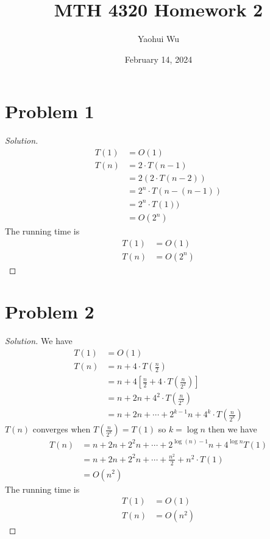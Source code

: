 \documentclass[12pt, letterpaper]{article}
\title{MTH 4320 Homework 2}
\author{Yaohui Wu}
\date{February 14, 2024}
\newenvironment{solution}{\begin{proof}[Solution]}{\end{proof}}
\begin{document}
\maketitle
\section{Problem 1}
\begin{solution}
    \begin{align*}
        T(1) &= O(1) \\ T(n) &= 2\cdot T(n-1) \\ &= 2(2\cdot T(n-2)) \\ &= 2^n\cdot T(n-(n-1)) \\
        &= 2^n\cdot T(1)) \\ &= O(2^n)
    \end{align*}
    The running time is
    \begin{align*}
        T(1) &= O(1) \\ T(n) &= O(2^n)
    \end{align*}
\end{solution}
\section{Problem 2}
\begin{solution}
    We have
    \begin{align*}
        T(1) &= O(1) \\
        T(n) &= n+4\cdot T\left(\frac{n}{2}\right) \\ &= n+4\left[\frac{n}{2}+4\cdot T\left(\frac{n}{2^2}\right)\right] \\
        &= n+2n+4^2\cdot T\left(\frac{n}{2^2}\right) \\ &= n+2n+\cdots+2^{k-1}n+4^k\cdot T\left(\frac{n}{2^k}\right)
    \end{align*}
    \(T(n)\) converges when \(T\left(\frac{n}{2^k}\right)=T(1)\) so \(k=\log n\) then we have
    \begin{align*}
        T(n) &= n+2n+2^2n+\cdots+2^{\log(n)-1}n+4^{\log n}T(1) \\ &= n+2n+2^2n+\cdots+\frac{n^2}{2}+n^2\cdot T(1) \\ &= O(n^2)
    \end{align*}
    The running time is
    \begin{align*}
        T(1) &= O(1) \\ T(n) &= O(n^2)
    \end{align*}
\end{solution}
\end{document}
